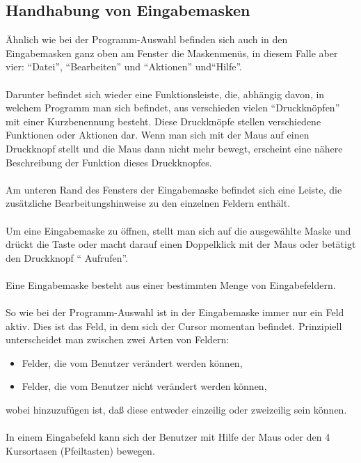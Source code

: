 \subsection{Handhabung von Eingabemasken}

\"{A}hnlich wie bei der Programm-Auswahl befinden sich auch in den Eingabemasken ganz
oben am Fenster die Maskenmen\"{u}s, in diesem Falle aber vier:
``Datei'', ``Bearbeiten'' und ``Aktionen'' und``Hilfe''.\\
\\
Darunter befindet sich wieder eine Funktionsleiste, die, abh\"{a}ngig davon, in
welchem Programm man sich befindet, aus verschieden vielen ``Druckkn\"{o}pfen''
mit einer Kurzbenennung besteht. Diese Druckkn\"{o}pfe stellen verschiedene
Funktionen oder Aktionen dar. Wenn man sich mit der Maus auf einen Druckknopf stellt und die Maus dann nicht mehr bewegt, erscheint eine
n\"{a}here Beschreibung der Funktion dieses Druckknopfes.\\
\\
Am unteren Rand des Fensters der Eingabemaske befindet sich eine Leiste,
die zus\"{a}tzliche Bearbeitungshinweise zu den einzelnen Feldern
enth\"{a}lt.\\
\\
Um eine Eingabemaske zu \"{o}ffnen, stellt man sich auf die ausgew\"{a}hlte
Maske und dr\"{u}ckt die Taste  oder macht darauf einen
Doppelklick mit der Maus oder bet\"{a}tigt den Druckknopf `` Aufrufen''.   \\
\\
Eine Eingabemaske besteht aus einer bestimmten Menge von Eingabefeldern.\\
\\
So wie bei der Programm-Auswahl ist in der Eingabemaske immer nur ein Feld
aktiv. Dies ist das Feld, in dem sich der Cursor momentan befindet. Prinzipiell
unterscheidet man zwischen zwei Arten von Feldern:

\begin{itemize}
\item Felder, die vom Benutzer ver\"{a}ndert werden k\"{o}nnen,
\item Felder, die vom Benutzer nicht ver\"{a}ndert werden k\"{o}nnen,
\end{itemize}
wobei hinzuzuf\"{u}gen ist, da{\ss} diese entweder einzeilig oder zweizeilig sein k\"{o}nnen.\\
\\
In einem Eingabefeld kann sich der Benutzer mit Hilfe der Maus oder den 4
Kursortasen (Pfeiltasten) bewegen.

